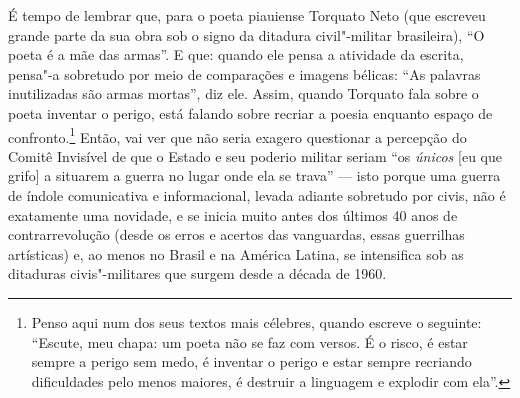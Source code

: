 \asterisc

É tempo de lembrar que, para o poeta piauiense Torquato Neto (que
escreveu grande parte da sua obra sob o signo da ditadura civil"-militar
brasileira), ``O poeta é a mãe das armas''. E que: quando ele pensa a
atividade da escrita, pensa"-a sobretudo por meio de comparações e
imagens bélicas: ``As palavras inutilizadas são armas mortas'', diz ele.
Assim, quando Torquato fala sobre o poeta inventar o perigo, está
falando sobre recriar a poesia enquanto espaço de confronto.\footnote{Penso
  aqui num dos seus textos mais célebres, quando escreve o seguinte:
  ``Escute, meu chapa: um poeta não se faz com versos. É o risco, é
  estar sempre a perigo sem medo, é inventar o perigo e estar sempre
  recriando dificuldades pelo menos maiores, é destruir a linguagem e
  explodir com ela''.} Então, vai ver que não seria exagero questionar
a percepção do Comitê Invisível de que o Estado e seu poderio militar
seriam ``os \emph{únicos} {[}eu que grifo{]} a situarem a guerra no
lugar onde ela se trava'' --- isto porque uma guerra de índole
comunicativa e informacional, levada adiante sobretudo por civis, não é
exatamente uma novidade, e se inicia muito antes dos últimos 40 anos de
contrarrevolução (desde os erros e acertos das vanguardas, essas
guerrilhas artísticas) e, ao menos no Brasil e na América Latina, se
intensifica sob as ditaduras civis"-militares que surgem desde a década
de 1960.

\asterisc

